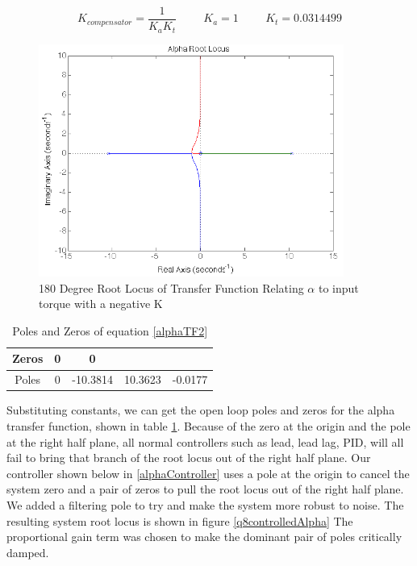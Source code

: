 \documentclass{article}
\theoremstyle{plain}
\theoremstyle{definition}
\theoremstyle{remark}
\begin{document}
$$ K_{compensator} = \frac{1}{K_a K_t} \hspace{1cm} K_a = 1 \hspace{1cm}  K_t = 0.0314499 $$

\begin{figure}
\begin{center}
\includegraphics[width = 10cm]{alpha-1closedLoop.png}
\end{center}
\caption{180 Degree Root Locus of Transfer Function Relating $\alpha$ to input torque with a negative K}
\label{q8alphaInit}
\end{figure}

\begin{table}
\begin{center}
    \begin{tabular}{|c|c|c|c|c|}
        \hline
        Zeros & 0 & 0        & ~       & ~       \\ \hline
        Poles & 0 & -10.3814 & 10.3623 & -0.0177 \\
        \hline
    \end{tabular}
\caption{Poles and Zeros of equation \eqref{alphaTF2}}
\label{Alpharoots}
\end{center}
\end{table}

Substituting constants, we can get the open loop poles and zeros for the alpha transfer function, shown in table \ref{Alpharoots}. Because of the zero at the origin and the pole at the right half plane, all normal controllers such as lead, lead lag, PID, will all fail to bring that branch of the root locus out of the right half plane.  Our controller shown below in \eqref{alphaController} uses a pole at the origin to cancel the system zero and a pair of zeros to pull the root locus out of the right half plane.  We added a filtering pole to try and make the system more robust to noise.  The resulting system root locus is shown in figure  \ref{q8controlledAlpha}  The proportional gain term was chosen to make the dominant pair of poles critically damped.  
\end{document}
